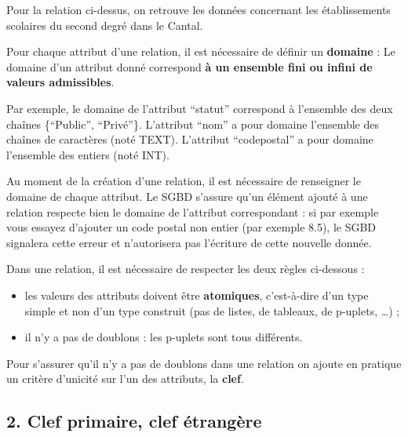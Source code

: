 \documentclass[
  a4paper,
  DIV=11,
  numbers=noendperiod]{scrartcl}
\providecommand{\tightlist}{%
  \setlength{\itemsep}{0pt}\setlength{\parskip}{0pt}}\usepackage{longtable,booktabs,array}
\begin{document}
Pour la relation ci-dessus, on retrouve les données concernant les
établissements scolaires du second degré dans le Cantal.

Pour chaque attribut d'une relation, il est nécessaire de définir un
\textbf{domaine} : Le domaine d'un attribut donné correspond \textbf{à
un ensemble fini ou infini de valeurs admissibles}.

Par exemple, le domaine de l'attribut ``statut'' correspond à l'ensemble
des deux chaînes \{``Public'', ``Privé''\}. L'attribut ``nom'' a pour
domaine l'ensemble des chaînes de caractères (noté TEXT). L'attribut
``codepostal'' a pour domaine l'ensemble des entiers (noté INT).

Au moment de la création d'une relation, il est nécessaire de renseigner
le domaine de chaque attribut. Le SGBD s'assure qu'un élément ajouté à
une relation respecte bien le domaine de l'attribut correspondant : si
par exemple vous essayez d'ajouter un code postal non entier (par
exemple 8.5), le SGBD signalera cette erreur et n'autorisera pas
l'écriture de cette nouvelle donnée.

\begin{tcolorbox}[enhanced jigsaw, opacityback=0, leftrule=.75mm, toptitle=1mm, toprule=.15mm, arc=.35mm, rightrule=.15mm, bottomtitle=1mm, title=\textcolor{quarto-callout-important-color}{\faExclamation}\hspace{0.5em}{Règles à respecter}, colbacktitle=quarto-callout-important-color!10!white, titlerule=0mm, coltitle=black, left=2mm, opacitybacktitle=0.6, bottomrule=.15mm, breakable, colback=white]

Dans une relation, il est nécessaire de respecter les deux règles
ci-dessous :

\begin{itemize}
\tightlist
\item
  les valeurs des attributs doivent être \textbf{atomiques},
  c'est-à-dire d'un type simple et non d'un type construit (pas de
  listes, de tableaux, de p-uplets, \ldots) ;
\item
  il n'y a pas de doublons : les p-uplets sont tous différents.
\end{itemize}

\end{tcolorbox}

Pour s'assurer qu'il n'y a pas de doublons dans une relation on ajoute
en pratique un critère d'unicité sur l'un des attributs, la
\textbf{clef}.

\hypertarget{clef-primaire-clef-uxe9tranguxe8re}{%
\subsection{2. Clef primaire, clef
étrangère}\label{clef-primaire-clef-uxe9tranguxe8re}}
\end{document}
